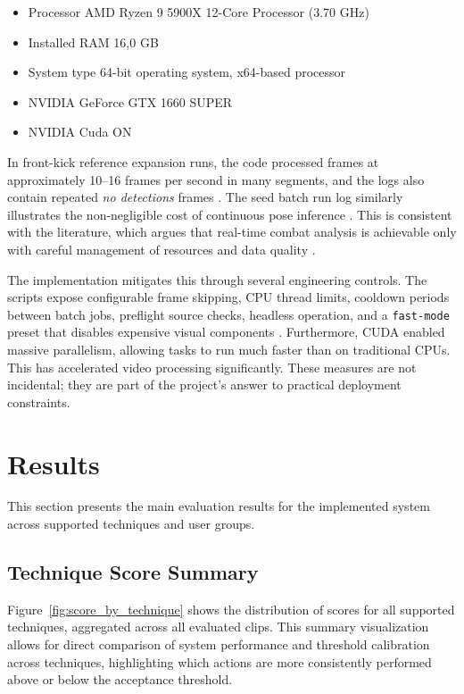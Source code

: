 \documentclass[12pt]{article}
\begin{document}
\begin{itemize}
    \item Processor	AMD Ryzen 9 5900X 12-Core Processor             (3.70 GHz)
    \item Installed RAM	16,0 GB
    \item System type	64-bit operating system, x64-based processor
    \item NVIDIA GeForce GTX 1660 SUPER
    \item NVIDIA Cuda ON
\end{itemize}

In front-kick reference expansion runs, the code processed frames at approximately 10--16 frames per second in many segments, and the logs also contain repeated \textit{no detections} frames \cite{projectFrontKickLog,projectFrontKickStrictLog}. The seed batch run log similarly illustrates the non-negligible cost of continuous pose inference \cite{projectSeedLog}. This is consistent with the literature, which argues that real-time combat analysis is achievable only with careful management of resources and data quality \cite{quinn2024automation,quinn2025yolo}.

The implementation mitigates this through several engineering controls. The scripts expose configurable frame skipping, CPU thread limits, cooldown periods between batch jobs, preflight source checks, headless operation, and a \texttt{fast-mode} preset that disables expensive visual components \cite{projectActionRecognition,projectRunBatch}. Furthermore, CUDA enabled massive parallelism, allowing tasks to run much faster than on traditional CPUs. This has accelerated video processing significantly. 
These measures are not incidental; they are part of the project's answer to practical deployment constraints.

\section{Results}
This section presents the main evaluation results for the implemented system across supported techniques and user groups.

\subsection{Technique Score Summary}

Figure~\ref{fig:score_by_technique} shows the distribution of scores for all supported techniques, aggregated across all evaluated clips. This summary visualization allows for direct comparison of system performance and threshold calibration across techniques, highlighting which actions are more consistently performed above or below the acceptance threshold.
\end{document}
